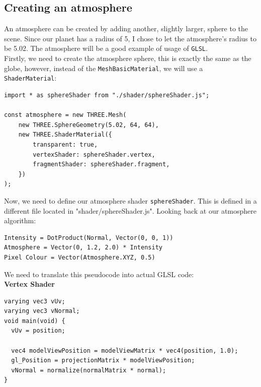 \subsection{Creating an atmosphere}
An atmosphere can be created by adding another, slightly larger, sphere to the scene. Since our planet has a radius of 5, I chose to let the atmosphere's radius to be 5.02. The atmosphere will be a good example of usage of \verb|GLSL|. \\
Firstly, we need to create the atmosphere sphere, this is exactly the same as the globe, however, instead of the \verb|MeshBasicMaterial|, we will use a \verb|ShaderMaterial|:
\begin{lstlisting}
import * as sphereShader from "./shader/sphereShader.js";

const atmosphere = new THREE.Mesh(
    new THREE.SphereGeometry(5.02, 64, 64),
    new THREE.ShaderMaterial({
        transparent: true,
        vertexShader: sphereShader.vertex,
        fragmentShader: sphereShader.fragment,
    })
);
\end{lstlisting}
Now, we need to define our atmosphere shader \verb|sphereShader|. This is defined in a different file located in "shader/sphereShader.js".
Looking back at our atmosphere algorithm:
\begin{lstlisting}
Intensity = DotProduct(Normal, Vector(0, 0, 1))
Atmosphere = Vector(0, 1.2, 2.0) * Intensity
Pixel Colour = Vector(Atmosphere.XYZ, 0.5)
\end{lstlisting}
We need to translate this pseudocode into actual GLSL code: \\
\newpage
\textbf{Vertex Shader}
\begin{lstlisting}
varying vec3 vUv;
varying vec3 vNormal;
void main(void) {
  vUv = position;

  vec4 modelViewPosition = modelViewMatrix * vec4(position, 1.0);
  gl_Position = projectionMatrix * modelViewPosition;
  vNormal = normalize(normalMatrix * normal);
}
\end{lstlisting}

